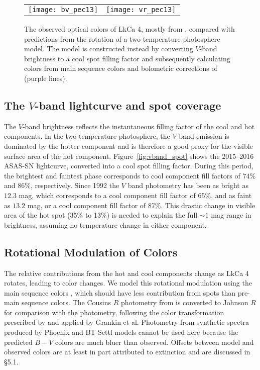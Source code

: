 \documentclass[twocolumn]{emulateapj}%
\begin{document}
\begin{figure*}
 \centering
 \begin{tabular}{ll}
 \texttt{[image: bv\_pec13]} 
    &
   \texttt{[image: vr\_pec13]}
    \end{tabular}
\caption{The observed optical colors of LkCa 4, mostly from \citet{grankin08}, compared with predictions from the rotation of a two-temperature photosphere model.  The model is constructed instead by converting $V$-band brightness to a cool spot filling factor and subsequently calculating colors from main sequence colors and bolometric corrections of \citet{pecaut13} (purple lines).}
\label{fig:colors}
\end{figure*}


\subsection{The $V$-band lightcurve and spot coverage}\label{sec:rotSpot1}

The  $V$-band brightness reflects the instantaneous filling factor of the cool and hot components.  In the two-temperature photosphere, the $V$-band emission is dominated by the hotter component and is therefore a good proxy for the visible surface area of the hot component.  Figure~\ref{fig:vband_spot} shows the 2015--2016 ASAS-SN lightcurve, converted into a cool spot filling factor.  During this period, the brightest and faintest phase corresponds to cool component fill factors of $74\%$ and $86\%$, respectively.  Since 1992 the $V$ band photometry has been as bright as $12.3$ mag, which corresponds to a cool component fill factor of $65\%$, and as faint as $13.2$ mag, or a cool component fill factor of $87\%$.  This drastic change in visible area of the hot spot (35\% to 13\%) is needed to explain the full $\sim 1$ mag range in brightness, assuming no temperature change in either component.


\subsection{Rotational Modulation of Colors}\label{sec:rotSpot}

The relative contributions from the hot and cool components change as LkCa 4 rotates, leading to color changes.  We model this rotational modulation using the main sequence colors \citep[compiled by][]{pecaut13}, which should have less contribution from spots than  pre-main sequence colors.  The Cousins $R$ photometry from \citet{pecaut13} is converted to Johnson $R$ for comparison with the \citet{grankin08} photometry, following the color transformation prescribed by \citet{landolt83} and applied by Grankin et al.  Photometry from synthetic spectra produced by Phoenix and BT-Settl models cannot be used here because the predicted $B-V$ colors are much bluer than observed.  Offsets between model and observed colors are at least in part attributed to extinction and are discussed in \S 5.1.  
\end{document}
